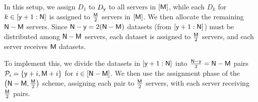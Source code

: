 \documentclass[conference,letterpaper]{IEEEtran}
\begin{document}
In this setup, we assign \(D_1\) to \(D_{{\sf y}}\) to all servers in \([{\sf M}]\), while each \(D_k\) for \(k \in [{\sf y}+1 : {\sf N}]\) is assigned to \(\frac{{\sf M}}{2}\) servers in \([{\sf M}]\). We then allocate the remaining \({\sf N}-{\sf M}\) servers. Since \({\sf N}-{\sf y} = 2({\sf N}-{\sf M})\) datasets (from \([{\sf y}+1 : {\sf N}]\)) must be distributed among \({\sf N}-{\sf M}\) servers, each dataset is assigned to \(\frac{{\sf M}}{2}\) servers, and each server receives \({\sf M}\) datasets. 

To implement this, we divide the datasets in \([{\sf y}+1 : {\sf N}]\) into \(\frac{{\sf N}-{\sf y}}{2} = {\sf N}-{\sf M}\) pairs \({\cal P}_i = \{{\sf y} + i, {\sf M} + i\}\) for \(i \in [{\sf N}-{\sf M}]\). We then use the assignment phase of the \(\bigl({\sf N}-{\sf M}, \tfrac{{\sf M}}{2}\bigr)\) scheme, assigning each pair to \(\tfrac{{\sf M}}{2}\) servers, with each server receiving \(\tfrac{{\sf M}}{2}\) pairs.
\end{document}
